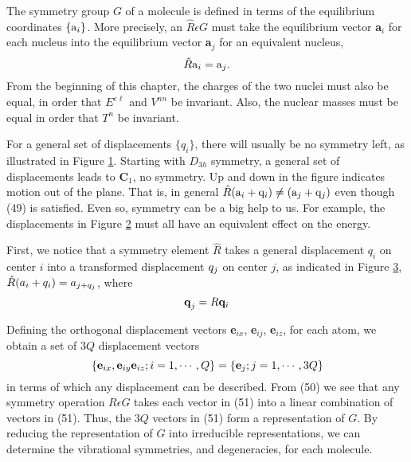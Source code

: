 The symmetry group $G$ of a molecule is defined in terms of the 
equilibrium coordinates $\{ {\bf{\rm a}}_i \}$.  More precisely, 
an ${\hat{R}}\epsilon G$ must take the equilibrium vector {\bf a}$_i$ 
for each nucleus into the equilibrium vector {\bf a}$_j$ for an 
equivalent nucleus,
\begin{equation}
{\hat{R}} {\bf{\rm a}}_i = {\bf{\rm a}}_j.
\label{chap16-eqno49}
\end{equation}
From the beginning of this chapter, the charges of the two nuclei 
must also be equal, in order that $E^{e\ell}$ and $V^{nn}$ be 
invariant.  Also, the nuclear masses must be equal in order that $T^n$ 
be invariant.

\begin{figure}
\caption{}
\label{chap16-fig38}
\end{figure}

For a general set of displacements $\{q_i\}$, there will usually be no
symmetry left, as illustrated in Figure \ref{chap16-fig38}.  Starting
with $D_{3h}$ symmetry, a general set of displacements leads to {\bf
C}$_1$, no symmetry.  Up and down in the figure indicates motion out
of the plane.  That is, in general ${\hat{R}}( {\bf{\rm a}}_i +
{\bf{\rm q}}_i) \not= ( {\bf{\rm a}}_j + {\bf{\rm q}}_j)$ even though
(49) is satisfied.  Even so, symmetry can be a big help to us.  For
example, the displacements in Figure \ref{chap16-fig39} must all have
an equivalent effect on the energy.

\begin{figure}
\caption{}
\label{chap16-fig39}
\end{figure}

First, we notice that a symmetry element $\hat{R}$ takes a general
displacement $q_i$ on center $i$ into a transformed displacement
$\-{q}_j$ on center $j$, as indicated in Figure \ref{chap16-fig40},
$\hat{R}(a_i + q_i ) = a_{j + \-{q}_j}$, where
\begin{equation}
{\bf{\- q}}_j = R {\bf q}_i
\label{chap16-eqno50}
\end{equation}

\begin{figure}
\caption{}
\label{chap16-fig40}
\end{figure}

Defining the orthogonal displacement vectors {\bf e}$_{ix}$, {\bf 
e}$_{ij}$, {\bf e}$_{iz}$, for each atom, we obtain a set of $3Q$ 
displacement vectors 
\begin{equation}
\left\{ {\bf e}_{ix} , {\bf e}_{iy} {\bf e}_{iz} ; i = 1 , \cdots , Q 
\right\} = \left\{ {\bf e}_j ; j = 1 , \cdots , 3 Q \right\}
\label{chap16-eqno51}
\end{equation}
in terms of which any displacement can be described.  From (50) we 
see that any symmetry operation $R \epsilon G$ takes each vector in 
(51) into a linear combination of vectors in (51).  Thus, the $3Q$ 
vectors in (51) form a representation of $G$.  By reducing the 
representation of $G$ into irreducible representations, we can 
determine the vibrational symmetries, and degeneracies, for each 
molecule.


